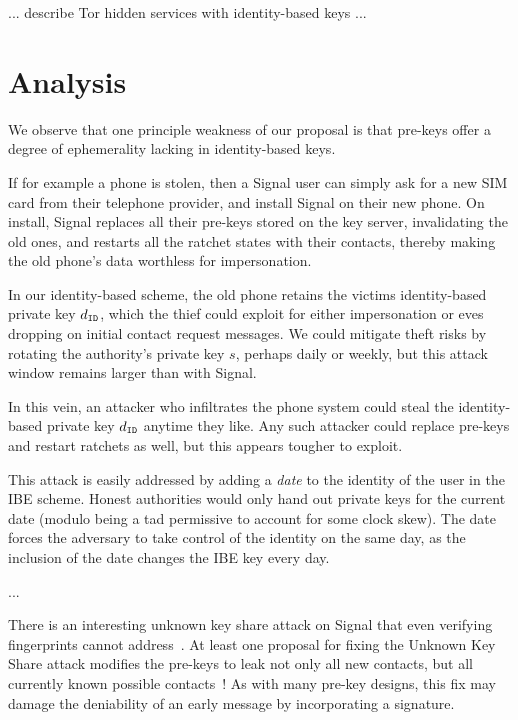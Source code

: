 \documentclass[twoside,letterpaper]{sig-alternate}
\begin{document}
... describe Tor hidden services with identity-based keys ...


\section{Analysis}

We observe that one principle weakness of our proposal is that pre-keys
offer a degree of ephemerality lacking in identity-based keys.

If for example a phone is stolen, then a Signal user can simply ask
for a new SIM card from their telephone provider, and install Signal
on their new phone.  On install, Signal replaces all their pre-keys
stored on the key server, invalidating the old ones, and restarts all
the ratchet states with their contacts, thereby making the old phone's
data worthless for impersonation.

In our identity-based scheme, the old phone retains the victims
identity-based private key $d_{\mathtt{ID}}$, which the thief could exploit for
either impersonation or eves dropping on initial contact request messages.
We could mitigate theft risks by rotating the authority's private key $s$,
perhaps daily or weekly, but this attack window remains larger than with Signal.

In this vein, an attacker who infiltrates the phone system could steal
the identity-based private key $d_{\mathtt{ID}}$ anytime they like.
Any such attacker could replace pre-keys and restart ratchets as well,
but this appears tougher to exploit.

This attack is easily addressed by adding a {\em date} to the
identity of the user in the IBE scheme.  Honest authorities would
only hand out private keys for the current date (modulo being
a tad permissive to account for some clock skew).  The date forces
the adversary to take control of the identity on the same day, as
the inclusion of the date changes the IBE key every day.

\smallskip


\smallskip

...

There is an interesting unknown key share attack on Signal that
even verifying fingerprints cannot address~\cite[\S4.2]{TextSecure}.
At least one proposal for fixing the Unknown Key Share attack
modifies the pre-keys to leak not only all new contacts, but
all currently known possible contacts~\cite[\S4.3]{TextSecure}!
As with many pre-key designs, this fix may damage the deniability
 of an early message by incorporating a signature.
\end{document}
